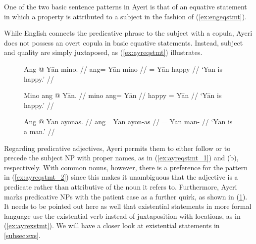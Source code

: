 One of the two basic sentence patterns in Ayeri is that of an equative
statement in which a property is attributed to a subject in the fashion of 
(\ref{ex:engeqstmt}).

\pex\label{ex:engeqstmt}
\a\label{ex:engeqstmt_1} 
\a\label{ex:engeqstmt_2} 
\a\label{ex:engeqstmt_3} 
\xe

While English connects the predicative phrase to the subject with a copula,
Ayeri does not possess an overt copula in basic equative statements. Instead,
subject and quality are simply juxtaposed, as (\ref{ex:ayreqstmt}) illustrates.

\begin{figure}
\pex\label{ex:ayreqstmt}
\a\label{ex:ayreqstmt_1}\begingl
	\gla Ang @ Yān mino. //
	\glb ang= Yān mino //
	\glc \Aarg{}= Yān happy //
	\glft `Yan is happy.' //
\endgl

\a\label{ex:ayreqstmt_2}\begingl
	\gla Mino ang @ Yān. //
	\glb mino ang= Yān //
	\glc happy \Aarg{}= Yān //
	\glft `Yān is happy.' //
\endgl

\a\label{ex:ayreqstmt_3}\begingl
	\gla Ang @ Yān ayonas. //
	\glb ang= Yān ayon-as //
	\glc \Aarg{}= Yān man-\Parg{} //
	\glft `Yān is a man.' //
\endgl
\xe
\end{figure}

Regarding predicative adjectives, Ayeri permits them to either follow or to
precede the subject NP with proper names, as in (\ref{ex:ayreqstmt_1}) and (b),
respectively. With common nouns, however, there is a preference for the pattern
in (\ref{ex:ayreqstmt_2}) since this makes it unambiguous that the adjective is
a predicate rather than attributive of the noun it refers to. Furthermore,
Ayeri marks predicative NPs with the patient case as a further quirk, as shown
in (\ref{ex:ayreqstmt_3}). It needs to be pointed out here as well that
existential statements in more formal language use the existential verb
 instead of juxtaposition with
locations, as in (\ref{ex:ayrexstmt}). We will have a closer look at
existential statements in \autoref{subsec:exs}.

